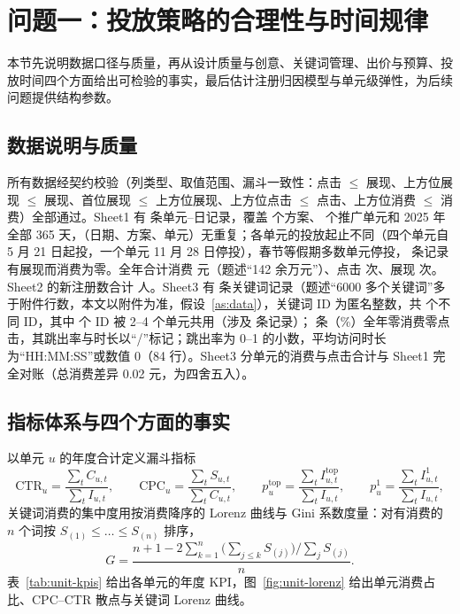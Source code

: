 \section{问题一：投放策略的合理性与时间规律}
\label{sec:q1}
本节先说明数据口径与质量，再从设计质量与创意、关键词管理、出价与预算、投放时间四个方面给出可检验的事实，最后估计注册归因模型与单元级弹性，为后续问题提供结构参数。

\subsection{数据说明与质量}
\label{sec:q1data}
所有数据经契约校验（列类型、取值范围、漏斗一致性：点击 $\le$ 展现、上方位展现 $\le$ 展现、首位展现 $\le$ 上方位展现、上方位点击 $\le$ 点击、上方位消费 $\le$ 消费）全部通过。Sheet1 有 \valUnitDays{} 条单元--日记录，覆盖 \valPlansCount{} 个方案、\valUnitsCount{} 个推广单元和 2025 年全部 365 天，（日期、方案、单元）无重复；各单元的投放起止不同（四个单元自 5 月 21 日起投，一个单元 11 月 28 日停投），春节等假期多数单元停投，\valZeroSpendUnitDays{} 条记录有展现而消费为零。全年合计消费 \valTotalSpend{} 元（题述“142 余万元”）、点击 \valTotalClicks{} 次、展现 \valTotalImpressions{} 次。Sheet2 的新注册数合计 \valTotalRegs{} 人。Sheet3 有 \valKeywordRows{} 条关键词记录（题述“6000 多个关键词”多于附件行数，本文以附件为准，假设~\ref{as:data}），关键词 ID 为匿名整数，共 \valUniqueKeywordIds{} 个不同 ID，其中 \valSharedKeywordIds{} 个 ID 被 2--4 个单元共用（涉及 \valSharedKeywordRows{} 条记录）；\valZeroKeywords{} 条（\valZeroKeywordSharePct\%）全年零消费零点击，其跳出率与时长以“/”标记；跳出率为 0--1 的小数，平均访问时长为“HH:MM:SS”或数值 0（84 行）。Sheet3 分单元的消费与点击合计与 Sheet1 完全对账（总消费差异 0.02 元，为四舍五入）。

\subsection{指标体系与四个方面的事实}
\label{sec:q1kpi}
以单元 $u$ 的年度合计定义漏斗指标
\begin{equation}\label{eq:kpi}
\mathrm{CTR}_u=\frac{\sum_t C_{u,t}}{\sum_t I_{u,t}},\qquad
\mathrm{CPC}_u=\frac{\sum_t S_{u,t}}{\sum_t C_{u,t}},\qquad
p^{\mathrm{top}}_u=\frac{\sum_t I^{\mathrm{top}}_{u,t}}{\sum_t I_{u,t}},\qquad
p^{1}_u=\frac{\sum_t I^{1}_{u,t}}{\sum_t I_{u,t}},
\end{equation}
关键词消费的集中度用按消费降序的 Lorenz 曲线与 Gini 系数度量：对有消费的 $n$ 个词按 $S_{(1)}\le\dots\le S_{(n)}$ 排序，
\begin{equation}\label{eq:gini}
G=\frac{n+1-2\sum_{k=1}^{n}\bigl(\sum_{j\le k}S_{(j)}\bigr)/\sum_{j}S_{(j)}}{n}.
\end{equation}
表~\ref{tab:unit-kpis} 给出各单元的年度 KPI，图~\ref{fig:unit-lorenz} 给出单元消费占比、CPC--CTR 散点与关键词 Lorenz 曲线。

